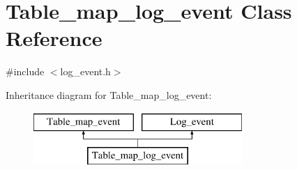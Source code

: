 \hypertarget{classTable__map__log__event}{}\section{Table\+\_\+map\+\_\+log\+\_\+event Class Reference}
\label{classTable__map__log__event}


{\ttfamily \#include $<$log\+\_\+event.\+h$>$}

Inheritance diagram for Table\+\_\+map\+\_\+log\+\_\+event\+:\begin{figure}[H]
\begin{center}
\leavevmode
\includegraphics[height=2.000000cm]{classTable__map__log__event}
\end{center}
\end{figure}

